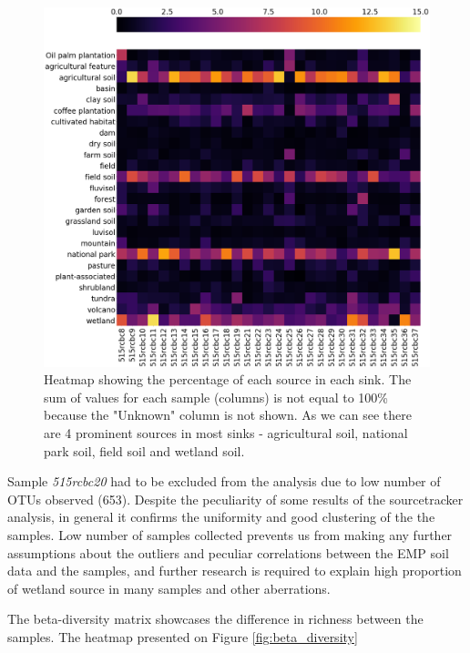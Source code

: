 \documentclass[12pt,twocolumn]{article}
\begin{document}
\begin{figure}[ht!]
	\includegraphics[width=\linewidth]{heatmap_perc.png}
	\caption{Heatmap showing the percentage of each source in each sink. The sum of values for each sample (columns) is not equal to 100\% because the "Unknown" column is not shown. As we can see there are 4 prominent sources in most sinks - agricultural soil, national park soil, field soil and wetland soil.}
	\label{fig:sourcetracker_heatmap}
\end{figure}

\par
Sample \textit{515rcbc20} had to be excluded from the analysis due to low number of OTUs observed (653). Despite the peculiarity of some results of the sourcetracker analysis, in general it confirms the uniformity and good clustering of the the samples. Low number of samples collected prevents us from making any further assumptions about the outliers and peculiar correlations between the EMP soil data and the samples, and further research is required to explain high proportion of wetland source in many samples and other aberrations.
\par






The beta-diversity matrix showcases the difference in richness between the samples. The heatmap presented on Figure \ref{fig:beta_diversity} 
\end{document}
